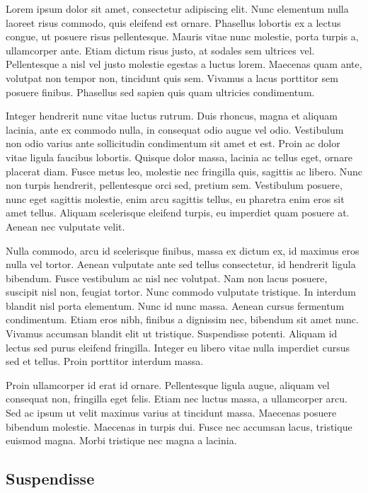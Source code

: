 \documentclass[twoside,openright,a4paper,11pt,french]{article}
\begin{document}
Lorem ipsum dolor sit amet, consectetur adipiscing elit. Nunc elementum nulla laoreet risus commodo, quis eleifend est ornare. Phasellus lobortis ex a lectus congue, ut posuere risus pellentesque. Mauris vitae nunc molestie, porta turpis a, ullamcorper ante. Etiam dictum risus justo, at sodales sem ultrices vel. Pellentesque a nisl vel justo molestie egestas a luctus lorem. Maecenas quam ante, volutpat non tempor non, tincidunt quis sem. Vivamus a lacus porttitor sem posuere finibus. Phasellus sed sapien quis quam ultricies condimentum.

Integer hendrerit nunc vitae luctus rutrum. Duis rhoncus, magna et aliquam lacinia, ante ex commodo nulla, in consequat odio augue vel odio. Vestibulum non odio varius ante sollicitudin condimentum sit amet et est. Proin ac dolor vitae ligula faucibus lobortis. Quisque dolor massa, lacinia ac tellus eget, ornare placerat diam. Fusce metus leo, molestie nec fringilla quis, sagittis ac libero. Nunc non turpis hendrerit, pellentesque orci sed, pretium sem. Vestibulum posuere, nunc eget sagittis molestie, enim arcu sagittis tellus, eu pharetra enim eros sit amet tellus. Aliquam scelerisque eleifend turpis, eu imperdiet quam posuere at. Aenean nec vulputate velit.

Nulla commodo, arcu id scelerisque finibus, massa ex dictum ex, id maximus eros nulla vel tortor. Aenean vulputate ante sed tellus consectetur, id hendrerit ligula bibendum. Fusce vestibulum ac nisl nec volutpat. Nam non lacus posuere, suscipit nisl non, feugiat tortor. Nunc commodo vulputate tristique. In interdum blandit nisl porta elementum. Nunc id nunc massa. Aenean cursus fermentum condimentum. Etiam eros nibh, finibus a dignissim nec, bibendum sit amet nunc. Vivamus accumsan blandit elit ut tristique. Suspendisse potenti. Aliquam id lectus sed purus eleifend fringilla. Integer eu libero vitae nulla imperdiet cursus sed et tellus. Proin porttitor interdum massa.

Proin ullamcorper id erat id ornare. Pellentesque ligula augue, aliquam vel consequat non, fringilla eget felis. Etiam nec luctus massa, a ullamcorper arcu. Sed ac ipsum ut velit maximus varius at tincidunt massa. Maecenas posuere bibendum molestie. Maecenas in turpis dui. Fusce nec accumsan lacus, tristique euismod magna. Morbi tristique nec magna a lacinia.

\subsection{Suspendisse}
\end{document}
